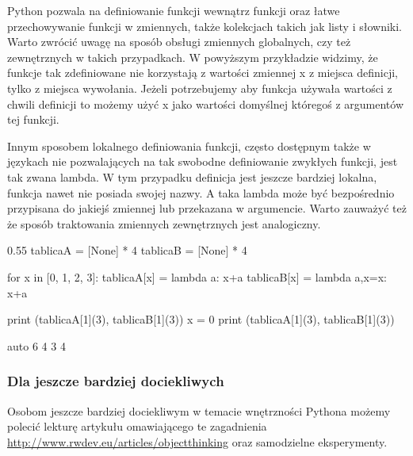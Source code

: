 Python pozwala na definiowanie funkcji wewnątrz funkcji oraz łatwe przechowywanie funkcji w zmiennych, także kolekcjach takich jak listy i słowniki.
Warto zwrócić uwagę na sposób obsługi zmiennych globalnych, czy też zewnętrznych w takich przypadkach.
W powyższym przykładzie widzimy, że funkcje tak zdefiniowane nie korzystają z wartości zmiennej x z miejsca definicji, tylko z miejsca wywołania.
Jeżeli potrzebujemy aby funkcja używała wartości z chwili definicji to możemy użyć x jako wartości domyślnej któregoś z argumentów tej funkcji.

Innym sposobem lokalnego definiowania funkcji, często dostępnym także w językach nie pozwalających na tak swobodne definiowanie zwykłych funkcji, jest tak zwana lambda.
W tym przypadku definicja jest jeszcze bardziej lokalna, funkcja nawet nie posiada swojej nazwy.
A taka lambda może być bezpośrednio przypisana do jakiejś zmiennej lub przekazana w argumencie.
Warto zauważyć też że sposób traktowania zmiennych zewnętrznych jest analogiczny.

\begin{CodeFrame}[python]{0.55\textwidth}
tablicaA = [None] * 4
tablicaB = [None] * 4

for x in [0, 1, 2, 3]:
	tablicaA[x] = lambda a: x+a
	tablicaB[x] = lambda a,x=x: x+a

print (tablicaA[1](3), tablicaB[1](3))
x = 0
print (tablicaA[1](3), tablicaB[1](3))
\end{CodeFrame}
\begin{CodeFrame}{auto}
6 4
3 4
\end{CodeFrame}


\subsubsection{Dla jeszcze bardziej dociekliwych }

Osobom jeszcze bardziej dociekliwym w temacie wnętrzności Pythona możemy polecić lekturę artykułu omawiającego te zagadnienia \url{http://www.rwdev.eu/articles/objectthinking} oraz samodzielne eksperymenty.
